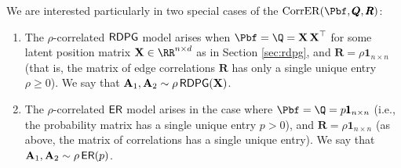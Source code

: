 
We are interested particularly in two special cases of the $\mathrm{CorrER}(\Pbf, \pmb Q, \pmb R)$:
\begin{enumerate}
    \item The $\rho$-correlated $\operatorname{\mathsf{RDPG}}$ model arises when $\Pbf = \Q=\X\X^\top$ for some latent position matrix $\X \in \RR^{n \times d}$  as in Section \ref{sec:rdpg}, and $\pmb R = \rho \pmb 1_{n \times n}$ (that is, the matrix of edge correlations $\pmb R$ has only a single unique entry $\rho\geq 0$). We say that $\operatorname{\mathbf{A}}_1, \operatorname{\mathbf{A}}_2 \sim \rho\operatorname{\mathsf{RDPG}}(\operatorname{\mathbf{X}})$.
    \item The $\rho$-correlated $\operatorname{\mathsf{ER}}$ model arises in the case where $\Pbf = \Q = p\pmb 1_{n \times n}$ (i.e.,  the probability matrix has a single unique entry $p>0$), and $\pmb R = \rho\pmb 1_{n \times n}$ (as above, the matrix of correlations has a single unique entry). We say that $\operatorname{\mathbf{A}}_1, \operatorname{\mathbf{A}}_2 \sim \rho\operatorname{\mathsf{ER}}(p)$.
\end{enumerate}